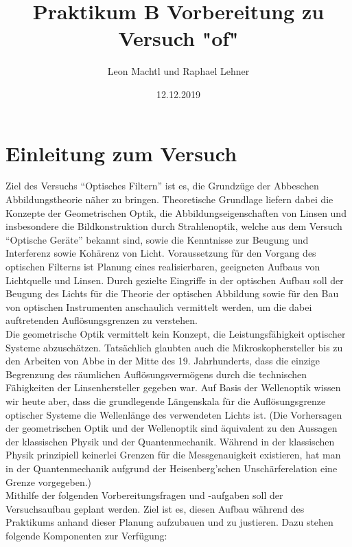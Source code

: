 \documentclass[a4paper,10pt]{scrartcl}
\title{Praktikum B Vorbereitung zu Versuch "of"}
\author{Leon Machtl und Raphael Lehner}
\date{12.12.2019}
\begin{document}
	\maketitle
	\tableofcontents
	\newpage
	
	\section{Einleitung zum Versuch}
Ziel des Versuchs ``Optisches Filtern'' ist es, die Grundzüge der Abbeschen Abbildungstheorie näher zu bringen. Theoretische Grundlage liefern dabei die Konzepte der Geometrischen Optik, die Abbildungseigenschaften von Linsen und insbesondere die Bildkonstruktion durch Strahlenoptik, welche aus dem Versuch ``Optische Geräte'' bekannt sind, sowie die Kenntnisse zur Beugung und Interferenz sowie Kohärenz von Licht. Voraussetzung für den Vorgang des optischen Filterns ist Planung eines realisierbaren, geeigneten Aufbaus von Lichtquelle und Linsen. Durch gezielte Eingriffe in der optischen Aufbau soll der Beugung des Lichts für die Theorie der optischen Abbildung sowie für den Bau von optischen Instrumenten anschaulich vermittelt werden, um die dabei auftretenden Auflösungsgrenzen zu verstehen.\\
	Die geometrische Optik vermittelt kein Konzept, die Leistungsfähigkeit optischer Systeme abzuschätzen. Tatsächlich glaubten auch die Mikroskophersteller bis zu den Arbeiten von Abbe in der Mitte des 19. Jahrhunderts, dass die einzige Begrenzung des räumlichen Auflösungsvermögens durch die technischen Fähigkeiten der Linsenhersteller gegeben war. Auf Basis der Wellenoptik wissen wir heute aber, dass die grundlegende Längenskala für die Auflösungsgrenze optischer Systeme die Wellenlänge des verwendeten Lichts ist. (Die Vorhersagen der geometrischen Optik und der Wellenoptik sind äquivalent zu den Aussagen der klassischen Physik und der Quantenmechanik. Während in der klassischen Physik prinzipiell keinerlei Grenzen für die Messgenauigkeit existieren, hat man in der Quantenmechanik aufgrund der Heisenberg'schen Unschärferelation eine Grenze vorgegeben.)\\
	Mithilfe der folgenden Vorbereitungsfragen und -aufgaben soll der Versuchsaufbau geplant werden. Ziel ist es, diesen Aufbau während des Praktikums anhand dieser Planung aufzubauen und zu justieren. Dazu stehen folgende Komponenten zur Verfügung:\\
\end{document}
